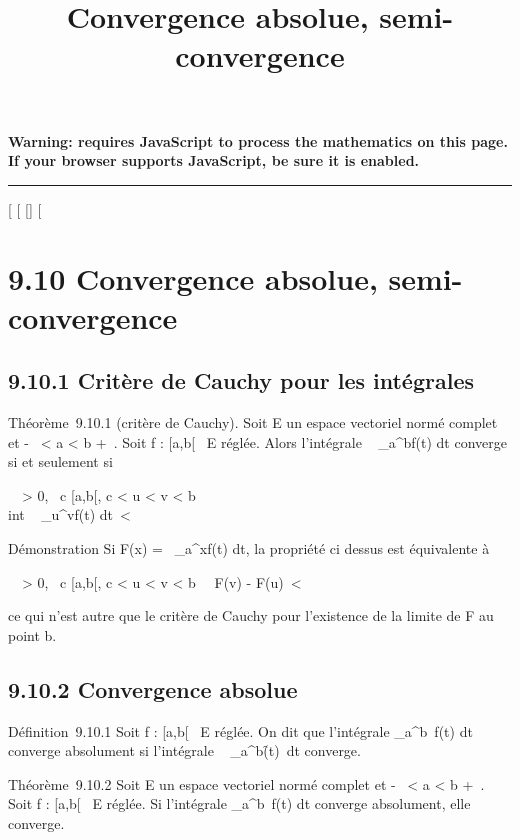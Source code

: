 \documentclass[]{article}
\title{Convergence absolue, semi-convergence}
\author{}
\date{}
\begin{document}
\maketitle

\textbf{Warning: 
requires JavaScript to process the mathematics on this page.\\ If your
browser supports JavaScript, be sure it is enabled.}

\begin{center}\rule{3in}{0.4pt}\end{center}

[
[
[]
[

\section{9.10 Convergence absolue, semi-convergence}

\subsection{9.10.1 Critère de Cauchy pour les intégrales}

Théorème~9.10.1 (critère de Cauchy). Soit E un espace vectoriel normé
complet et -\infty~ < a < b \leq +\infty~. Soit f : [a,b[\rightarrow~ E
réglée. Alors l'intégrale \int ~
_a^bf(t) dt converge si et seulement si~

\forall~~\epsilon > 0,
\exists~c \in [a,b[, c < u < v
< b \rigtharrow~\\int ~
_u^vf(t) dt\ < \epsilon

Démonstration Si F(x) =\int ~
_a^xf(t) dt, la propriété ci dessus est équivalente à

\forall~~\epsilon > 0,
\exists~c \in [a,b[, c < u < v
< b \rigtharrow~\ F(v) -
F(u)\ < \epsilon

ce qui n'est autre que le critère de Cauchy pour l'existence de la
limite de F au point b.

\subsection{9.10.2 Convergence absolue}

Définition~9.10.1 Soit f : [a,b[\rightarrow~ E réglée. On dit que l'intégrale
\int  _a^b~f(t) dt converge
absolument si l'intégrale \int ~
_a^b\f(t)\
dt converge.

Théorème~9.10.2 Soit E un espace vectoriel normé complet et -\infty~
< a < b \leq +\infty~. Soit f : [a,b[\rightarrow~ E réglée. Si
l'intégrale \int  _a^b~f(t) dt
converge absolument, elle converge.
\end{document}

